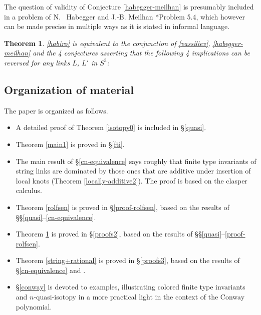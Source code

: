 \documentclass[a4paper,12pt,reqno,oneside]{amsart} %
\theoremstyle{plain}
\newtheorem{mainthm}{Theorem}
\theoremstyle{definition}
\theoremstyle{named}
\renewcommand{\:}{\colon}
\begin{document}
The question of validity of Conjecture \ref{habegger-meilhan} is presumably included in a problem of N.~ Habegger and J.-B. Meilhan 
\cite{HM}*{Problem 5.4}, which however can be made precise in multiple ways as it is stated in informal language.

\begin{mainthm} \label{main2}
\ref{habiro} is equivalent to the conjunction of \ref{vassiliev}, \ref{habegger-meilhan} and the 4 conjectures asserting that 
the following 4 implications can be reversed for any links $L$, $L'$ in $S^3$:
\bigskip

\noindent{}
\end{mainthm}

\subsection{Organization of material}
The paper is organized as follows.
\begin{itemize}
\item A detailed proof of Theorem \ref{isotopy0} is included in \S\ref{quasi}.
\item Theorem \ref{main1} is proved in \S\ref{fti}.
\item The main result of \S\ref{cn-equivalence} says roughly that finite type invariants of string links are dominated 
by those ones that are additive under insertion of local knots (Theorem \ref{locally-additive2}). 
The proof is based on the clasper calculus.
\item Theorem \ref{rolfsen} is proved in \S\ref{proof-rolfsen}, based on the results of \S\S\ref{quasi}--\ref{cn-equivalence}.
\item Theorem \ref{main2} is proved in \S\ref{proofs2}, based on the results of \S\S\ref{quasi}--\ref{proof-rolfsen}. 
\item Theorem \ref{string+rational} is proved in \S\ref{proofs3}, based on the results of \S\ref{cn-equivalence} and 
\cite{M24-1'}.
\item \S\ref{conway} is devoted to examples, illustrating colored finite type invariants and $n$-quasi-isotopy 
in a more practical light in the context of the Conway polynomial.
\end{itemize}
\end{document}

